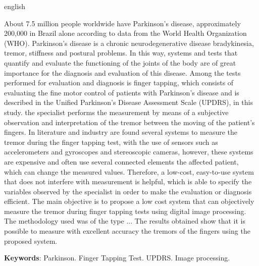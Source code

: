 \documentclass[
	12pt,				%
	openany,			%
	oneside,			%
	a4paper,			%
	english,			%
	french,				%
	spanish,			%
	brazil				%
	]{abntex2}
\begin{document}
\begin{resumo}[Abstract]
 \begin{otherlanguage*}{english}
 
About 7.5 million people worldwide have Parkinson's disease, approximately 200,000 in Brazil alone
according to data from the World Health Organization (WHO). Parkinson's disease is a chronic neurodegenerative disease
bradykinesia, tremor, stiffness and postural problems. In this way, systems and tests that quantify and evaluate the functioning of the joints of the body are of great importance for the diagnosis and evaluation of this disease. Among the tests performed for evaluation and diagnosis is finger tapping, which consists of evaluating the fine motor control of patients with Parkinson's disease and is described in the Unified Parkinson's Disease Assessment Scale (UPDRS), in this study. the specialist performs the measurement by means of a subjective observation and interpretation of the tremor between the moving of the patient's fingers. In literature and industry are found several systems to measure the tremor during the finger tapping test, with the use of sensors such as accelerometers and gyroscopes and stereoscopic cameras, however, these systems are expensive and often use several connected elements the affected patient, which can change the measured values. Therefore, a low-cost, easy-to-use system that does not interfere with measurement is helpful, which is able to specify the variables observed by the specialist in order to make the evaluation or diagnosis efficient. The main objective is to propose a low cost system that can objectively measure the tremor during finger tapping tests using digital image processing. The methodology used was of the type ... The results obtained show that it is possible to measure with excellent accuracy the tremors of the fingers using the proposed system.

   \vspace{\onelineskip}
 
   \noindent 
   \textbf{Keywords}: Parkinson. Finger Tapping Test. UPDRS. Image processing.
 \end{otherlanguage*}
\end{resumo}

% 
\end{document}
